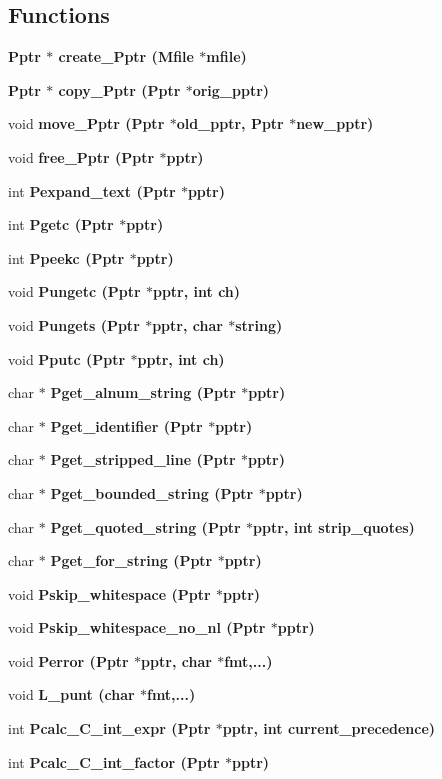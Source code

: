 \subsection*{Functions}
\begin{CompactItemize}
\item 
\bf{Pptr} $\ast$ \bf{create\_\-Pptr} (\bf{Mfile} $\ast$mfile)
\item 
\bf{Pptr} $\ast$ \bf{copy\_\-Pptr} (\bf{Pptr} $\ast$orig\_\-pptr)
\item 
void \bf{move\_\-Pptr} (\bf{Pptr} $\ast$old\_\-pptr, \bf{Pptr} $\ast$new\_\-pptr)
\item 
void \bf{free\_\-Pptr} (\bf{Pptr} $\ast$pptr)
\item 
int \bf{Pexpand\_\-text} (\bf{Pptr} $\ast$pptr)
\item 
int \bf{Pgetc} (\bf{Pptr} $\ast$pptr)
\item 
int \bf{Ppeekc} (\bf{Pptr} $\ast$pptr)
\item 
void \bf{Pungetc} (\bf{Pptr} $\ast$pptr, int ch)
\item 
void \bf{Pungets} (\bf{Pptr} $\ast$pptr, char $\ast$string)
\item 
void \bf{Pputc} (\bf{Pptr} $\ast$pptr, int ch)
\item 
char $\ast$ \bf{Pget\_\-alnum\_\-string} (\bf{Pptr} $\ast$pptr)
\item 
char $\ast$ \bf{Pget\_\-identifier} (\bf{Pptr} $\ast$pptr)
\item 
char $\ast$ \bf{Pget\_\-stripped\_\-line} (\bf{Pptr} $\ast$pptr)
\item 
char $\ast$ \bf{Pget\_\-bounded\_\-string} (\bf{Pptr} $\ast$pptr)
\item 
char $\ast$ \bf{Pget\_\-quoted\_\-string} (\bf{Pptr} $\ast$pptr, int strip\_\-quotes)
\item 
char $\ast$ \bf{Pget\_\-for\_\-string} (\bf{Pptr} $\ast$pptr)
\item 
void \bf{Pskip\_\-whitespace} (\bf{Pptr} $\ast$pptr)
\item 
void \bf{Pskip\_\-whitespace\_\-no\_\-nl} (\bf{Pptr} $\ast$pptr)
\item 
void \bf{Perror} (\bf{Pptr} $\ast$pptr, char $\ast$fmt,...)
\item 
void \bf{L\_\-punt} (char $\ast$fmt,...)
\item 
int \bf{Pcalc\_\-C\_\-int\_\-expr} (\bf{Pptr} $\ast$pptr, int current\_\-precedence)
\item 
int \bf{Pcalc\_\-C\_\-int\_\-factor} (\bf{Pptr} $\ast$pptr)
\item 

\end{CompactItemize}

